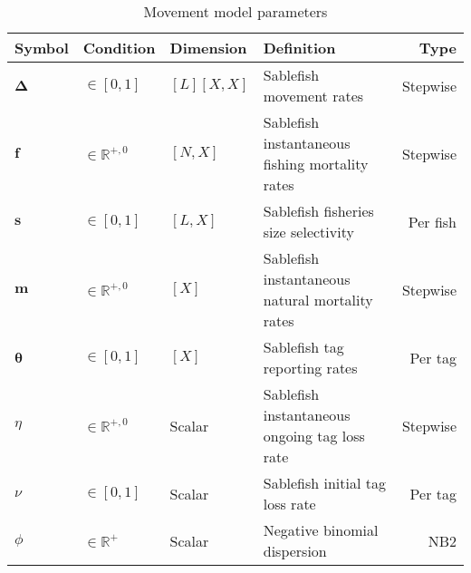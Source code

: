 \documentclass{article}
\begin{document}
\begin{table}[ht]
  \centering
  \caption{Movement model parameters}
  \renewcommand\arraystretch{1.2}
  \label{tab:model-parameters}
  \begin{tabular}{l l l l r}
    \toprule
    \textbf{Symbol} & \textbf{Condition} & \textbf{Dimension} & \textbf{Definition} & \textbf{Type} \\
    \toprule
    $\boldsymbol{\Delta}$ & $\in \left[0, 1 \right]$ & $[L][X, X]$ & Sablefish movement rates & Stepwise \\
    $\bm{f}$ & $\in \mathbb{R}^{+,0}$ & $[N, X]$ & Sablefish instantaneous fishing mortality rates & Stepwise \\
    $\bm{s}$ & $\in \left[0, 1 \right]$ & $[L, X]$ & Sablefish fisheries size selectivity & Per fish \\
    $\bm{m}$ & $\in \mathbb{R}^{+,0}$ & $[X]$ & Sablefish instantaneous natural mortality rates & Stepwise \\
    $\boldsymbol{\theta}$ & $\in \left[0, 1 \right]$ & $[X]$ & Sablefish tag reporting rates & Per tag \\
    $\eta$ & $\in \mathbb{R}^{+,0}$ & Scalar & Sablefish instantaneous ongoing tag loss rate & Stepwise \\
    $\nu$ & $\in \left[0, 1 \right]$ & Scalar & Sablefish initial tag loss rate & Per tag \\    
    $\phi$ & $\in \mathbb{R}^{+}$ & Scalar & Negative binomial dispersion & NB2 \\
    \bottomrule
  \end{tabular}
\end{table}




\end{document}
